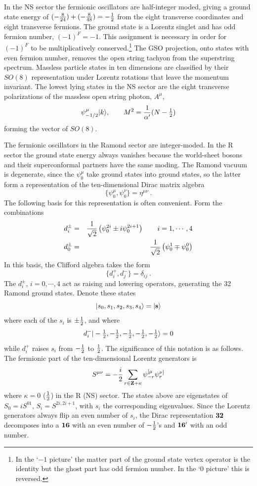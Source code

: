 \documentclass[12pt]{article}
\def\be{\begin{equation}}
\def\ee{\end{equation}}
\def\bea{\begin{eqnarray}}
\def\eea{\end{eqnarray}}
\def\ha{{\textstyle{1\over 2}}}
\begin{document}
In the NS sector the fermionic
oscillators are half-integer moded, giving a ground state energy of
$
(-{{8}\over{24}})+(-{{8}\over{48}})
 = - {1\over 2}
$
from the eight transverse coordinates and eight transverse
fermions.  The ground state is a
Lorentz singlet and has odd 
fermion number, $(-1)^F = -1$.  This assignment is necessary in order for
$(-1)^F$ to be multiplicatively conserved.\footnote{In the `$-1$
picture' \cite{fms}
the matter part of the ground state vertex operator is the
identity but the ghost part has odd fermion number.  In the `0 picture' this
is reversed.\label{picfoot}} The GSO projection, onto states with even fermion
number, removes the open string tachyon from the superstring spectrum. 
Massless particle states in ten dimensions are classified by their $SO(8)$
representation under Lorentz rotations that leave the momentum invariant. 
The lowest lying states in the NS sector are the eight transverse
polarizations of the massless open string photon, $A^{\mu}$, 
\be
\psi^{\mu}_{-1/2} |{ k}\rangle, \qquad M^2={{1}\over{\alpha'}} (N - \ha)
\ee
forming the vector of $SO(8)$. 

The fermionic oscillators in the Ramond sector are integer-moded.
In the R sector the ground state energy always vanishes
because the world-sheet bosons and their superconformal partners have the
same moding.
The Ramond vacuum is degenerate, since the $\psi^{\mu}_0$ take ground 
states into ground states, so the latter form a representation of the 
ten-dimensional Dirac matrix algebra  
\be
\{ \psi^{\mu}_0 , \psi^{\nu}_0 \} = \eta^{\mu \nu}\ .
\ee
The following basis for this representation is often convenient.  Form
the combinations
\bea
d^{\pm}_i &=& {{1}\over{\sqrt 2}}\left ( \psi^{2i}_0\pm i \psi^{2i+1}_0\right
) \qquad i=1,\cdots,4 \nonumber\\ 
 d^{\pm}_0 &=& {{1}\over{\sqrt 2}}\left ( \psi^{1}_0 \mp \psi^{0}_0\right ) 
\eea
In this basis, the Clifford algebra takes the form
\be
\{ d^{+}_i, d^{-}_j \}=\delta_{ij}\ .
\ee
The $d^{\pm}_i$, $i = 0, \cdots, 4$ act as raising and lowering 
operators, generating the 32 Ramond ground states.  Denote these
states
\be
|s_0,s_1,s_2,s_3,s_4 \rangle = |{\bf s}\rangle
\ee
where each of the $s_i$ is $\pm\ha$, and where
\be
d^{-}_{i} | -\ha , -\ha , -\ha , -\ha , -\ha \rangle = 0  
\ee
while $d^{+}_i$ raises $s_i$ from $-\ha$ to $\ha$.
The significance of this notation is as follows.  The fermionic part of the
ten-dimensional Lorentz generators is 
\be
S^{\mu \nu} = - {{i}\over{2}} \sum_{r \in {\bf Z }+\kappa} 
  \psi^{[ \mu}_{-r}\psi^{\nu ]}_r  
\ee
where $\kappa=0$ ($\ha$) in the R (NS) sector.  The states above are
eigenstates of $S_0 = iS^{01}$, $S_i = S^{2i,2i+1}$, with $s_i$ the
corresponding eigenvalues.  Since the Lorentz generators always flip an
even number of $s_i$, the Dirac representation $\bf 32$ decomposes into a
$\bf 16$ with an even number of $-\ha$'s and $\bf 16'$ with an odd number.
\end{document}
